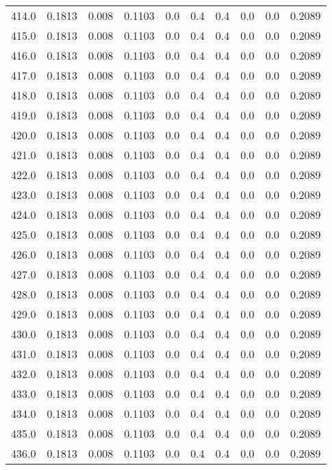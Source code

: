 \begin{longtable}{lrrrrrrrrr}
414.0 & 0.1813 & 0.008 & 0.1103 & 0.0 & 0.4 & 0.4 & 0.0 & 0.0 & 0.2089 \\
415.0 & 0.1813 & 0.008 & 0.1103 & 0.0 & 0.4 & 0.4 & 0.0 & 0.0 & 0.2089 \\
416.0 & 0.1813 & 0.008 & 0.1103 & 0.0 & 0.4 & 0.4 & 0.0 & 0.0 & 0.2089 \\
417.0 & 0.1813 & 0.008 & 0.1103 & 0.0 & 0.4 & 0.4 & 0.0 & 0.0 & 0.2089 \\
418.0 & 0.1813 & 0.008 & 0.1103 & 0.0 & 0.4 & 0.4 & 0.0 & 0.0 & 0.2089 \\
419.0 & 0.1813 & 0.008 & 0.1103 & 0.0 & 0.4 & 0.4 & 0.0 & 0.0 & 0.2089 \\
420.0 & 0.1813 & 0.008 & 0.1103 & 0.0 & 0.4 & 0.4 & 0.0 & 0.0 & 0.2089 \\
421.0 & 0.1813 & 0.008 & 0.1103 & 0.0 & 0.4 & 0.4 & 0.0 & 0.0 & 0.2089 \\
422.0 & 0.1813 & 0.008 & 0.1103 & 0.0 & 0.4 & 0.4 & 0.0 & 0.0 & 0.2089 \\
423.0 & 0.1813 & 0.008 & 0.1103 & 0.0 & 0.4 & 0.4 & 0.0 & 0.0 & 0.2089 \\
424.0 & 0.1813 & 0.008 & 0.1103 & 0.0 & 0.4 & 0.4 & 0.0 & 0.0 & 0.2089 \\
425.0 & 0.1813 & 0.008 & 0.1103 & 0.0 & 0.4 & 0.4 & 0.0 & 0.0 & 0.2089 \\
426.0 & 0.1813 & 0.008 & 0.1103 & 0.0 & 0.4 & 0.4 & 0.0 & 0.0 & 0.2089 \\
427.0 & 0.1813 & 0.008 & 0.1103 & 0.0 & 0.4 & 0.4 & 0.0 & 0.0 & 0.2089 \\
428.0 & 0.1813 & 0.008 & 0.1103 & 0.0 & 0.4 & 0.4 & 0.0 & 0.0 & 0.2089 \\
429.0 & 0.1813 & 0.008 & 0.1103 & 0.0 & 0.4 & 0.4 & 0.0 & 0.0 & 0.2089 \\
430.0 & 0.1813 & 0.008 & 0.1103 & 0.0 & 0.4 & 0.4 & 0.0 & 0.0 & 0.2089 \\
431.0 & 0.1813 & 0.008 & 0.1103 & 0.0 & 0.4 & 0.4 & 0.0 & 0.0 & 0.2089 \\
432.0 & 0.1813 & 0.008 & 0.1103 & 0.0 & 0.4 & 0.4 & 0.0 & 0.0 & 0.2089 \\
433.0 & 0.1813 & 0.008 & 0.1103 & 0.0 & 0.4 & 0.4 & 0.0 & 0.0 & 0.2089 \\
434.0 & 0.1813 & 0.008 & 0.1103 & 0.0 & 0.4 & 0.4 & 0.0 & 0.0 & 0.2089 \\
435.0 & 0.1813 & 0.008 & 0.1103 & 0.0 & 0.4 & 0.4 & 0.0 & 0.0 & 0.2089 \\
436.0 & 0.1813 & 0.008 & 0.1103 & 0.0 & 0.4 & 0.4 & 0.0 & 0.0 & 0.2089 \\

\end{longtable}
